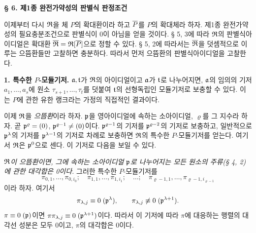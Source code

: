 \begin{center}
\textbf{§ 6. 제1종 완전가약성의 판별식 판정조건}
\end{center}

이제부터 다시 \(\mathfrak{R}\)을 체 \(P\)의 확대환이라 하고 \(\overline P\)를 \(P\)의 확대체라 하자. 제1종 완전가약성의 필요충분조건으로 판별식이 0이 아님을 얻을 것이다. § 5, 3에 따라 \(\mathfrak{R}\)의 판별식아이디얼은 확대환 \(\overline{\mathfrak R}=\mathfrak{R}[\overline P]\)으로 정할 수 있다. § 5, 2에 따라서는 \(\overline{\mathfrak R}\)을 덧셈적으로 이루는 으뜸환들만 고찰하면 충분하다. 따라서 먼저 으뜸환의 판별식아이디얼을 고찰한다.

\textbf{1. 특수한 \(P\)-모듈기저.} \(\mathfrak{a},\mathfrak t\)가 \(\mathfrak{R}\)의 아이디얼이고 \(\mathfrak{a}\)가 \(\mathfrak t\)로 나누어지면, \(\mathfrak{a}\)의 임의의 기저 \(a_1,\ldots,a_s\)에 원소 \(\tau_{s+1},\ldots,\tau_t\)를 덧붙여 \(\mathfrak t\)의 선형독립인 모듈기저로 보충할 수 있다. 이는 \(P\)에 관한 유한 랭크라는 가정의 직접적인 결과이다.

이제 \(\mathfrak{R}\)을 \emph{으뜸환}이라 하자. \(\mathfrak p\)을 영아이디얼에 속하는 소아이디얼, \(\varrho\)를 그 지수라 하자. 곧 \(\mathfrak p^\varrho=(0)\), \(\mathfrak p^{\varrho-1}\ne(0)\)이다. \(\mathfrak p^{\varrho-1}\)의 기저를 \(\mathfrak p^{\varrho-2}\)의 기저로 보충하고, 일반적으로 \(\mathfrak p^\lambda\)의 기저를 \(\mathfrak p^{\lambda-1}\)의 기저로 차례로 보충하면 \(\mathfrak{R}\)의 특수한 \(P\)-모듈기저를 얻는다. 여기서 \(\mathfrak{R}\)은 \(\mathfrak p^0\)으로 센다. 이 기저로 다음을 보일 수 있다.

\emph{\(\mathfrak{R}\)이 으뜸환이면, 그에 속하는 소아이디얼 \(\mathfrak p\)로 나누어지는 모든 원소의 주류(§ 4, 2)에 관한 대각합은 0이다.} 그러한 특수한 \(P\)-모듈기저를
\[
\pi_{0,1},\ldots,\pi_{0,i_0};\quad
\pi_{1,1},\ldots,\pi_{1,i_1};\quad\ldots;\quad
\pi_{\varrho-1,1},\ldots,\pi_{\varrho-1,i_{\varrho-1}}
\]
이라 하자. 여기서
\[
\pi_{\lambda,j}\equiv0\;(\mathfrak p^\lambda),
\qquad \pi_{\lambda,j}\not\equiv0\;(\mathfrak p^{\lambda+1}).
\]
\(\pi\equiv0\;(\mathfrak p)\)이면 \(\pi\pi_{\lambda,j}\equiv0\;(\mathfrak p^{\lambda+1})\)이다. 따라서 이 기저에 따라 \(\pi\)에 대응하는 행렬의 대각선 성분은 모두 0이고, \(\pi\)의 대각합은 0이다.

